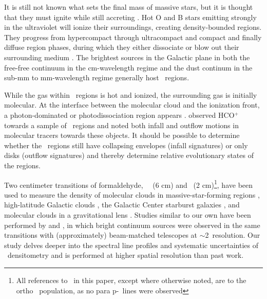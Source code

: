 It is still not known what sets the final mass of massive stars, but it
is thought that they must ignite while still accreting
\citep{mckee2007}.  Hot O and B stars emitting strongly in the ultraviolet will
ionize their surroundings, creating density-bounded  regions.  They
progress from hypercompact through ultracompact and compact and finally diffuse
 region phases, during which they either dissociate or blow out their
surrounding medium \citep{Churchwell2002,keto2007}.  The brightest sources in the
Galactic plane in both the free-free continuum in the cm-wavelength regime and
the dust continum in the sub-mm to mm-wavelength regime generally host \uchii\
regions.



While the gas within \uchii\ regions is hot and ionized, the surrounding gas is
initially molecular.  At the interface between the molecular cloud and
the ionization front, a photon-dominated or photodissociation region appears
\citep{Roshi2005}.  \citet{Churchwell2010} observed HCO$^+$ towards a
sample of \uchii\ regions and noted both infall and outflow motions in
molecular tracers towards these objects.  It should be possible to determine
whether the \uchii\ regions still have collapsing envelopes (infall signatures)
or only disks (outflow signatures) and thereby determine relative evolutionary
states of the regions.

Two centimeter transitions of formaldehyde, \ortho\ \oneone\ (6 cm) and
\twotwo\ (2 cm)\footnote{All references to \formaldehyde\ in this paper,
except where otherwise noted, are to the ortho \ortho\ population, as no para p-\formaldehyde\ 
lines were observed}, have been used to measure the density of molecular
clouds in massive-star-forming regions \citep[e.g., ][]{Dickel1986,Dickel1987},
high-latitude Galactic clouds \citep[e.g., ][]{Turner1989}, the Galactic Center
\citep[e.g., ][]{Zylka1992} starburst galaxies \citep[e.g., ][]{Mangum2008}, and molecular clouds
in a gravitational lens \citep[e.g., ][]{Zeiger2010}.  Studies similar to our own have
been performed by \citet{Wadiak1988} and \citet{Henkel1983}, in which bright
continuum sources were observed in the same transitions with
(approximately) beam-matched telescopes at $\sim$2\arcmin\ resolution. Our
study delves deeper into the spectral line profiles and systematic uncertainties of
\formaldehyde\ densitometry and is performed at higher spatial resolution than
past work.


